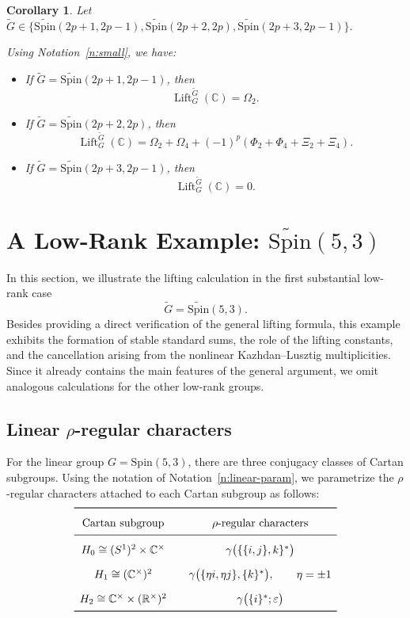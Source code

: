 \documentclass{amsart}
\DeclareMathOperator{\Lift}{Lift}
\newcommand{\LiftC}{\Lift_G^{\tu G}(\bbC)}
\newcommand{\bbC}{{\mathbb{C}}}
\newcommand{\bbR}{{\mathbb R}}
\newcommand{\Spin}{{\mathrm{Spin}}}
\newtheorem{cor}[thm]{Corollary}
\theoremstyle{definition}
\newcommand{\tu}{\widetilde}
\begin{document}
\begin{cor}
Let
$\widetilde G\in
\{
\widetilde{\Spin}(2p+1,2p-1),
\widetilde{\Spin}(2p+2,2p),
\widetilde{\Spin}(2p+3,2p-1)
\}.$

Using Notation~\ref{n:small}, we have:

\begin{itemize}
    \item[(a)] If
    \(\widetilde G=\widetilde{\Spin}(2p+1,2p-1)\), then
    \[
    \LiftC=\Omega_2.
    \]

    \item[(b)] If
    \(\widetilde G=\widetilde{\Spin}(2p+2,2p)\), then
    \[
    \LiftC
    =
    \Omega_2+\Omega_4
    +
    (-1)^p
    (\Phi_2+\Phi_4+\Xi_2+\Xi_4).
    \]

    \item[(c)] If
    \(\widetilde G=\widetilde{\Spin}(2p+3,2p-1)\), then
    \[
    \LiftC=0.
    \]
\end{itemize}
\end{cor}



 
\section{A Low-Rank Example: $\tu\Spin(5,3)$} \label{s:low-rank}

In this section, we illustrate the lifting calculation in the first
substantial low-rank case
\[
\tu G=\tu{\Spin}(5,3).
\]
Besides providing a direct verification of the general lifting formula,
this example exhibits the formation of stable standard sums, the role of
the lifting constants, and the cancellation arising from the nonlinear
Kazhdan--Lusztig multiplicities. Since it already contains the main
features of the general argument, we omit analogous calculations for the
other low-rank groups.


\subsection{Linear $\rho$-regular characters}


For the linear group $G=\Spin(5,3)$, there are three conjugacy classes of
Cartan subgroups. Using the notation of Notation~\ref{n:linear-param}, we
parametrize the \(\rho\)-regular characters attached to each Cartan subgroup
as follows:
\[
\renewcommand{\arraystretch}{1.6}
\begin{array}{c@{\qquad}c}
\toprule
\text{Cartan subgroup}
&
\rho\text{-regular characters}
\\
\midrule
H_0\cong(S^1)^2\times\bbC^\times
&
\gamma\bigl(\{\{i,j\},k\}^*\bigr)
\\[1mm]
H_1\cong(\bbC^\times)^2
&
\gamma\bigl(\{\eta i,\eta j\},\{k\}^*\bigr),
\qquad \eta=\pm1
\\[1mm]
H_2\cong\bbC^\times\times(\bbR^\times)^2
&
\gamma\bigl(\{i\}^*;\varepsilon\bigr)
\\
\bottomrule
\end{array}
\]
\end{document}
